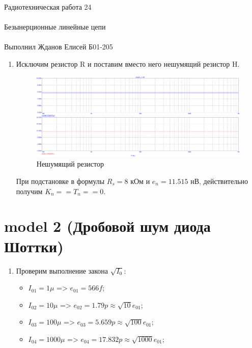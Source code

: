 \documentclass{astroedu-lab}
\begin{document}
\begin{problem}{\huge Радиотехническая работа 24\\\\Безынерционные линейные цепи\\\\Выполнил Жданов Елисей Б01-205}
\begin{enumerate}

\item 

Исключим резистор R и поставим вместо него нешумящий резистор H. 

\begin{figure}[h!]
    \centering
    \includegraphics[scale=0.3]{images/mod1_3_2.png}
    \caption{Нешумящий резистор}
\end{figure}

При подстановке в формулы $R_s = 8$ кОм и $e_n = 11.515 $ нВ, действительно получим $K_n == T_n == 0$.

\end{enumerate}

\section{\textbf{model 2 (Дробовой шум диода Шоттки)}}

\newpage

\begin{enumerate}

\item

Проверим выполнение закона $\sqrt{I_0}$:
\begin{itemize}
    \item $I_{01} = 1\mu$ => $e_{01} = 566f$;
    \item $I_{02} = 10\mu$ => $e_{02} = 1.79p \approx \sqrt{10}e_{01}$;
    \item $I_{03} = 100\mu$ => $e_{03} = 5.659p \approx \sqrt{100}e_{01}$; 
    \item $I_{04} = 1000\mu$ => $e_{04} = 17.832p \approx \sqrt{1000}e_{01}$;
\end{itemize}


\end{enumerate}
\end{problem}
\end{document}
